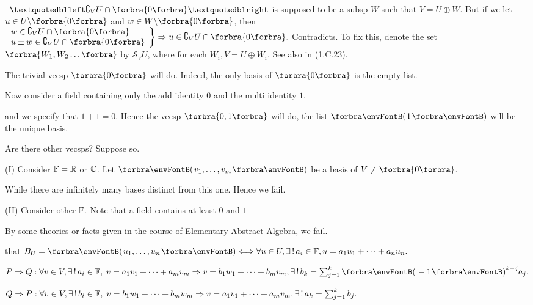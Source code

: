 \documentclass[a4paper, 11pt, UTF8]{article}
\begin{document}
\begin{large}
\BulletPoint \,\hspace{1pt}\TextB{}
$“\complement_V U \cap \zeroSubs”$ is supposed to be a subsp $W$ such that $V=U\oplus W$.\TextB{}
But if we let $u\in U\backslash\zeroSubs$ and $w\in W\backslash\zeroSubs$, then $\MathRightBrace{l}{w\in\complement_V U \cap \zeroSubs\\ u\pm w\in\complement_V U \cap \zeroSubs }\Rightarrow u\in\complement_V U \cap \zeroSubs.$ Contradicts.\vspace{4pt}\TextB{}
To fix this, {\Large\envFontLarge denote the set $\Bra{W_1,W_2\dots}$ by $\mathcal{S}_V U$,} {\small where for each $W_i,V=U\oplus W_i$. See also in (1.C.23).}\par\SepLine

The trivial vecsp $\zeroSubs$ will do. Indeed, the only basis of $\zeroSubs$ is the empty list.\par\quad
Now consider a field containing only the add identity $0$ and the multi identity $1$,\par\quad
and we specify that $1+1=0.$ Hence the vecsp $\Bra{0,1}$ will do, the list $\Par{1}$ will be the unique basis.\par\quad
Are there other vecsps? Suppose so.\par\quad
(I) Consider ${\mathbb{F}}={\mathbb{R}}$ or ${\mathbb{C}}$. Let $\Par{v_1,\dots,v_m}$ be a basis of $V\neq\zeroSubs$.\par\quad\HI
While there are infinitely many bases distinct from this one. Hence we fail.\par\quad\EndI
(II) Consider other ${\mathbb{F}}.$ Note that a field contains at least $0$ and $1$\par\quad\HII
By {\tgsc some theories or facts} given in the course of Elementary Abstract Algebra, we fail.\PfEnd
\SepLine

\NOTICE that $B_U=\Par{u_1,\dots,u_n}\Longleftrightarrow\forall u\in U,\exists\,!\,a_i\in\Fbb,u=a_1 u_1+\dots+a_n u_n.$\par\quad
$P\Rightarrow Q:\forall v\in V,\exists\,!\,a_i\in\Fbb,\;v=a_1 v_1+\dots+a_m v_m\Rightarrow v=b_1 w_1+\dots+b_m v_m,\exists\,!\,b_k=\sum_{j=1}^k\Par{-1}^{k-j}a_j.$\par\quad
$Q\Rightarrow P:\forall v\in V,\exists\,!\,b_i\in{\mathbb{F}},\;v=b_1w_1+\dots+b_mw_m\Rightarrow v=a_1v_1+\dots+a_mv_m,\exists\,!\,a_k=\sum_{j=1}^k b_j.$\PfEnd
\SepLine


\end{large}
\end{document}
